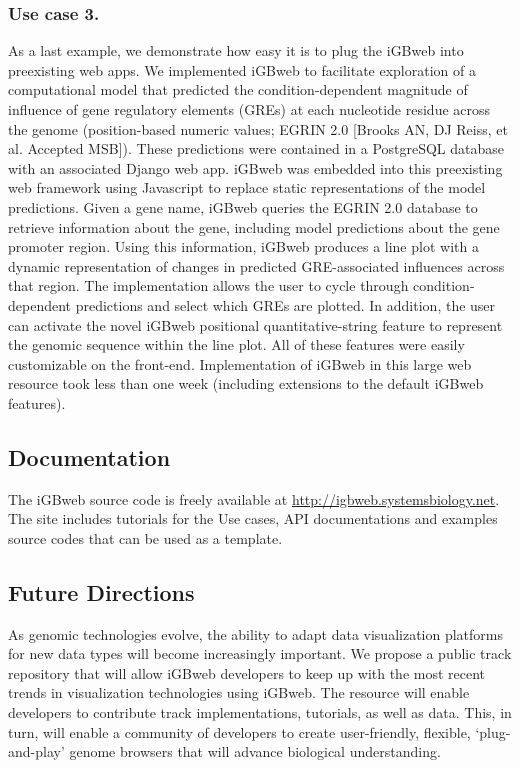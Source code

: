 \subsubsection{Use case 3.} As a last example, we demonstrate how easy it is to plug the iGBweb into preexisting web apps. We implemented iGBweb to facilitate exploration of a computational model that predicted the condition-dependent magnitude of influence of gene regulatory elements (GREs) at each nucleotide residue across the genome (position-based numeric values; EGRIN 2.0 [Brooks AN, DJ Reiss, et al. Accepted MSB]). These predictions were contained in a PostgreSQL database with an associated Django web app. iGBweb was embedded into this preexisting web framework using Javascript to replace static representations of the model predictions. Given a gene name, iGBweb queries the EGRIN 2.0 database to retrieve information about the gene, including model predictions about the gene promoter region. Using this information, iGBweb produces a line plot with a dynamic representation of changes in predicted GRE-associated influences across that region. The implementation allows the user to cycle through condition-dependent predictions and select which GREs are plotted. In addition, the user can activate the novel iGBweb positional quantitative-string feature to represent the genomic sequence within the line plot. All of these features were easily customizable on the front-end. Implementation of iGBweb in this large web resource took less than one week (including extensions to the default iGBweb features). 

\subsection{Documentation}

The  iGBweb  source code is freely available at  \href{http://igbweb.systemsbiology.net}{http://igbweb.systemsbiology.net}. The site includes tutorials for the Use cases, API documentations and examples source codes that can be used as a template.

\subsection{Future Directions}

As genomic technologies evolve, the ability to adapt data visualization platforms for new data types will become increasingly important. We propose a public track repository that will allow iGBweb developers to keep up with the most recent trends in visualization technologies using iGBweb. The resource will enable developers to contribute track implementations, tutorials, as well as data. This, in turn, will enable a community of developers to create user-friendly, flexible, ‘plug-and-play’ genome browsers that will advance biological understanding. 